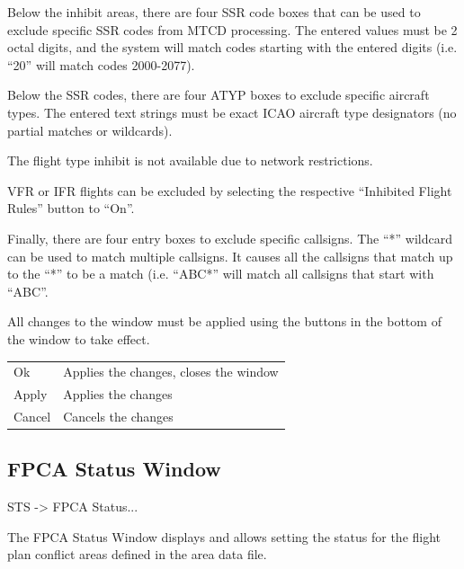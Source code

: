 \documentclass[a4paper,oneside,11pt]{memoir}
\begin{document}
\bigskip

Below the inhibit areas, there are four SSR code boxes that can be used to exclude specific SSR codes from MTCD processing. The entered values must be 2 octal digits, and the system will match codes starting with the entered digits (i.e. “20” will match codes 2000-2077).

\bigskip

Below the SSR codes, there are four ATYP boxes to exclude specific aircraft types. The entered text strings must be exact ICAO aircraft type designators (no partial matches or wildcards).

\bigskip

The flight type inhibit is not available due to network restrictions.

\bigskip

VFR or IFR flights can be excluded by selecting the respective “Inhibited Flight Rules” button to “On”.

\bigskip

Finally, there are four entry boxes to exclude specific callsigns. The “*” wildcard can be used to match multiple callsigns. It causes all the callsigns that match up to the “*” to be a match (i.e. “ABC*” will match all callsigns that start with “ABC”.

\bigskip

All changes to the window must be applied using the buttons in the bottom of the window to take effect.

\bigskip

\begin{longtable}{p{2.5cm} p{10cm}}
    Ok      & Applies the changes, closes the window\\
    Apply   & Applies the changes\\
    Cancel  & Cancels the changes\\
\end{longtable}

\subsection{FPCA Status Window}\label{win:fpcas}

 STS -> FPCA Status...


The FPCA Status Window displays and allows setting the status for the flight plan conflict areas defined in the area data file.

\bigskip
\end{document}
